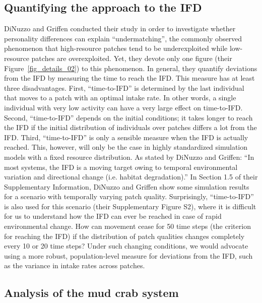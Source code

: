 \begin{interludeenv}
	\subsection*{Quantifying the approach to the IFD}
	
	DiNuzzo and Griffen conducted their study in order to investigate whether personality differences can explain ``undermatching'', the commonly observed phenomenon that high-resource patches tend to be underexploited while low-resource patches are overexploited.
	Yet, they devote only one figure (their Figure~\ref{fig_details_02}) to this phenomenon.
	In general, they quantify deviations from the IFD by measuring the time to reach the IFD.
	This measure has at least three disadvantages.
	First, ``time-to-IFD'' is determined by the last individual that moves to a patch with an optimal intake rate.
	In other words, a single individual with very low activity can have a very large effect on time-to-IFD.
	Second, ``time-to-IFD'' depends on the initial conditions; it takes longer to reach the IFD if the initial distribution of individuals over patches differs a lot from the IFD.
	Third, ``time-to-IFD'' is only a sensible measure when the IFD is actually reached.
	This, however, will only be the case in highly standardized simulation models with a fixed resource distribution.
	As stated by DiNuzzo and Griffen: ``In most systems, the IFD is a moving target owing to temporal environmental variation and directional change (i.e. habitat degradation).'' 
	In Section 1.5 of their Supplementary Information, DiNuzzo and Griffen show some simulation results for a scenario with temporally varying patch quality.
	Surprisingly, ``time-to-IFD'' is also used for this scenario (their Supplementary Figure S2), where it is difficult for us to understand how the IFD can ever be reached in case of rapid environmental change.
	How can movement cease for 50 time steps (the criterion for reaching the IFD) if the distribution of patch qualities changes completely every 10 or 20 time steps? Under such changing conditions, we would advocate using a more robust, population-level measure for deviations from the IFD, such as the variance in intake rates across patches. 
	
	\subsection*{Analysis of the mud crab system}
	

\end{interludeenv}
